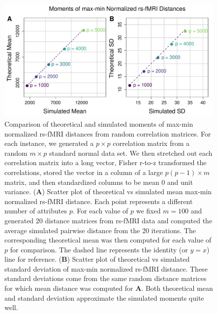 \documentclass[10pt,letterpaper]{article}\usepackage[]{graphicx}\usepackage[]{color}
\begin{document}
\begin{figure}[H]
	\includegraphics[width=\textwidth]{compared_moments_rs-fMRI_max-min.pdf}
	\caption{Comparison of theoretical and simulated moments of max-min normalized rs-fMRI distances from random correlation matrices. For each instance, we generated a $p \times p$ correlation matrix from a random $m \times p$ standard normal data set. We then stretched out each correlation matrix into a long vector, Fisher r-to-z transformed the correlations, stored the vector in a column of a large $p(p-1) \times m$ matrix, and then standardized columns to be mean 0 and unit variance. (\textbf{A}) Scatter plot of theoretical vs simulated mean max-min normalized rs-fMRI distance. Each point represents a different number of attributes $p$. For each value of $p$ we fixed $m=100$ and generated 20 distance matrices from rs-fMRI data and computed the average simulated pairwise distance from the 20 iterations. The corresponding theoretical mean was then computed for each value of $p$ for comparison. The dashed line represents the identity (or $y=x$) line for reference. (\textbf{B}) Scatter plot of theoretical vs simulated standard deviation of max-min normalized rs-fMRI distance. These standard deviations come from the same random distance matrices for which mean distance was computed for \textbf{A}. Both theoretical mean and standard deviation approximate the simulated moments quite well.}
\end{figure}
\end{document}

